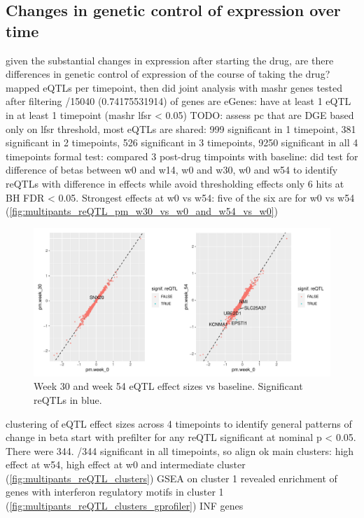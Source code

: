 \begin{outline}
\subsection{Changes in genetic control of expression over time}

\1 given the substantial changes in expression after starting the drug, are there differences in genetic control of expression of the course of taking the drug? 
\1 mapped eQTLs per timepoint, then did joint analysis with mashr
     genes tested after filtering
    /15040 (0.74175531914) of genes are eGenes: have at least 1 eQTL in at least 1 timepoint (mashr lfsr < 0.05)
    \2 TODO: assess pc that are DGE
\1 based only on lfsr threshold, most eQTLs are shared: 999 significant in 1 timepoint, 381 significant in 2 timepoints, 526 significant in 3 timepoints, 9250 significant in all 4 timepoints
    \2 formal test: compared 3 post-drug timpoints with baseline: did test for difference of betas between w0 and w14, w0 and w30, w0 and w54 to identify reQTLs with difference in effects while avoid thresholding effects
    \2 only 6 hits at BH FDR < 0.05. Strongest effects at w0 vs w54: five of the six are for w0 vs w54 (\autoref{fig:multipants_reQTL_pm_w30_vs_w0_and_w54_vs_w0})

\begin{figure}
    \centering
    \includegraphics[width=1.0\textwidth,page=1]{mainmatter/figures/chapter_04/plot_dge_eqtl.pm_w30_vs_w0_and_w54_vs_w0}
    \caption{Week 30 and week 54 eQTL effect sizes vs baseline. Significant reQTLs in blue.}
    \label{fig:multipants_reQTL_pm_w30_vs_w0_and_w54_vs_w0}
\end{figure}

\1 clustering of eQTL effect sizes across 4 timepoints to identify general patterns of change in beta 
    \2 start with prefilter for any reQTL significant at nominal p < 0.05. There were 344.
        /344 significant in all timepoints, so align ok
     main clusters: high effect at w54, high effect at w0 and intermediate cluster (\autoref{fig:multipants_reQTL_clusters}) 
    \2 GSEA on cluster 1 revealed enrichment of genes with interferon regulatory motifs in cluster 1 (\autoref{fig:multipants_reQTL_clusters_gprofiler})
     INF genes
    

\end{outline}

